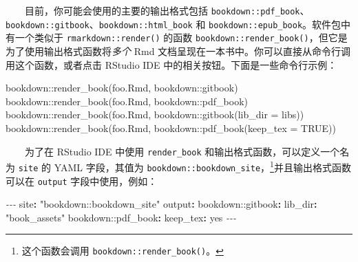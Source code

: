 \documentclass[
  12pt,
]{krantz}
\newenvironment{Shaded}{\begin{snugshade}}{\end{snugshade}}
\newcommand{\AttributeTok}[1]{\textcolor[rgb]{0.77,0.63,0.00}{#1}}
\newcommand{\CharTok}[1]{\textcolor[rgb]{0.31,0.60,0.02}{#1}}
\newcommand{\ConstantTok}[1]{\textcolor[rgb]{0.00,0.00,0.00}{#1}}
\newcommand{\FunctionTok}[1]{\textcolor[rgb]{0.00,0.00,0.00}{#1}}
\newcommand{\KeywordTok}[1]{\textcolor[rgb]{0.13,0.29,0.53}{\textbf{#1}}}
\newcommand{\NormalTok}[1]{#1}
\newcommand{\PreprocessorTok}[1]{\textcolor[rgb]{0.56,0.35,0.01}{\textit{#1}}}
\newcommand{\SpecialCharTok}[1]{\textcolor[rgb]{0.00,0.00,0.00}{#1}}
\newcommand{\StringTok}[1]{\textcolor[rgb]{0.31,0.60,0.02}{#1}}
\theoremstyle{definition}
\theoremstyle{definition}
\theoremstyle{definition}
\theoremstyle{definition}
\theoremstyle{remark}
\begin{document}
  目前，你可能会使用的主要的输出格式包括 \texttt{bookdown::pdf\_book}、\texttt{bookdown::gitbook}、\texttt{bookdown::html\_book} 和 \texttt{bookdown::epub\_book}。软件包中有一个类似于 \texttt{rmarkdown::render()} 的函数 \texttt{bookdown::render\_book()}，但它是为了使用输出格式函数将\emph{多个} Rmd 文档呈现在一本书中。你可以直接从命令行调用这个函数，或者点击 RStudio IDE 中的相关按钮。下面是一些命令行示例：

\begin{Shaded}
\begin{Highlighting}[]
\NormalTok{bookdown}\SpecialCharTok{::}\FunctionTok{render\_book}\NormalTok{(}\StringTok{\textquotesingle{}foo.Rmd\textquotesingle{}}\NormalTok{, }\StringTok{\textquotesingle{}bookdown::gitbook\textquotesingle{}}\NormalTok{)}
\NormalTok{bookdown}\SpecialCharTok{::}\FunctionTok{render\_book}\NormalTok{(}\StringTok{\textquotesingle{}foo.Rmd\textquotesingle{}}\NormalTok{, }\StringTok{\textquotesingle{}bookdown::pdf\_book\textquotesingle{}}\NormalTok{)}
\NormalTok{bookdown}\SpecialCharTok{::}\FunctionTok{render\_book}\NormalTok{(}\StringTok{\textquotesingle{}foo.Rmd\textquotesingle{}}\NormalTok{, bookdown}\SpecialCharTok{::}\FunctionTok{gitbook}\NormalTok{(}\AttributeTok{lib\_dir =} \StringTok{\textquotesingle{}libs\textquotesingle{}}\NormalTok{))}
\NormalTok{bookdown}\SpecialCharTok{::}\FunctionTok{render\_book}\NormalTok{(}\StringTok{\textquotesingle{}foo.Rmd\textquotesingle{}}\NormalTok{, bookdown}\SpecialCharTok{::}\FunctionTok{pdf\_book}\NormalTok{(}\AttributeTok{keep\_tex =} \ConstantTok{TRUE}\NormalTok{))}
\end{Highlighting}
\end{Shaded}

  为了在 RStudio IDE 中使用 \texttt{render\_book} 和输出格式函数，可以定义一个名为 \texttt{site} 的 YAML 字段，其值为 \texttt{bookdown::bookdown\_site}，\footnote{这个函数会调用 \texttt{bookdown::render\_book()}。}并且输出格式函数可以在 \texttt{output} 字段中使用，例如：

\begin{Shaded}
\begin{Highlighting}[]
\PreprocessorTok{{-}{-}{-}}
\FunctionTok{site}\KeywordTok{:}\AttributeTok{ }\StringTok{"bookdown::bookdown\_site"}
\FunctionTok{output}\KeywordTok{:}
\AttributeTok{  bookdown:}\FunctionTok{:gitbook}\KeywordTok{:}
\AttributeTok{    }\FunctionTok{lib\_dir}\KeywordTok{:}\AttributeTok{ }\StringTok{"book\_assets"}
\AttributeTok{  bookdown:}\FunctionTok{:pdf\_book}\KeywordTok{:}
\AttributeTok{    }\FunctionTok{keep\_tex}\KeywordTok{:}\AttributeTok{ }\CharTok{yes}
\PreprocessorTok{{-}{-}{-}}
\end{Highlighting}
\end{Shaded}
\end{document}
